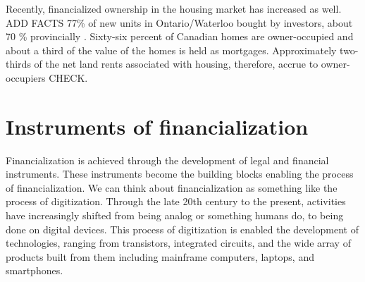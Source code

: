 Recently, financialized ownership in the housing market has increased as well.
ADD FACTS 77\% of new units in Ontario/Waterloo bought by investors, about 70 \% provincially \cite{}.
Sixty-six percent of Canadian homes are owner-occupied and about a third of the value of the homes is held as mortgages. Approximately two-thirds of the net land rents associated with housing, therefore, accrue to owner-occupiers \cite{nemtinFinancializationHousingSocial2021} CHECK. %


\section{Instruments of financialization }

Financialization is achieved through the development of legal and financial instruments. 
These instruments become the building blocks enabling the process of financialization. 
We can think about financialization as something like the process of \gls{digitization}. 
Through the late 20th century to the present, activities have increasingly shifted from being analog or something humans do, to being done on digital devices. This process of digitization %
is enabled the development of technologies, ranging from  transistors, integrated circuits, and the wide array of products built from them including mainframe computers, laptops, and smartphones.  %

